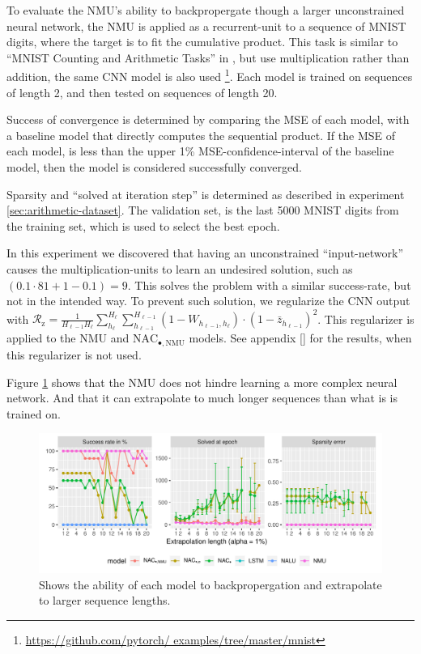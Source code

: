 To evaluate the NMU's ability to backpropergate though a larger unconstrained neural network, the NMU is applied as a recurrent-unit to a sequence of MNIST digits, where the target is to fit the cumulative product. This task is similar to ``MNIST Counting and Arithmetic Tasks'' in \cite{trask-nalu}, but use multiplication rather than addition, the same CNN model is also used \footnote{\url{https://github.com/pytorch/
examples/tree/master/mnist}}. Each model is trained on sequences of length 2, and then tested on sequences of length 20.

Success of convergence is determined by comparing the MSE of each model, with a baseline model that directly computes the sequential product. If the MSE of each model, is less than the upper 1\% MSE-confidence-interval of the baseline model, then the model is considered successfully converged.

Sparsity and ``solved at iteration step'' is determined as described in experiment \ref{sec:arithmetic-dataset}. The validation set, is the last 5000 MNIST digits from the training set, which is used to select the best epoch.

In this experiment we discovered that having an unconstrained ``input-network'' causes the multiplication-units to learn an undesired solution, such as $(0.1 \cdot 81 + 1 - 0.1) = 9$. This solves the problem with a similar success-rate, but not in the intended way. To prevent such solution, we regularize the CNN output with $\mathcal{R}_{\mathrm{z}} = \frac{1}{H_{\ell-1} H_\ell} \sum_{h_\ell}^{H_\ell} \sum_{h_{\ell-1}}^{H_{\ell-1}} (1 - W_{h_{\ell-1},h_\ell}) \cdot (1 - \bar{z}_{h_{\ell-1}})^2$. This regularizer is applied to the NMU and $\mathrm{NAC}_{\bullet,\mathrm{NMU}}$ models. See appendix \ref{} for the results, when this regularizer is not used.

Figure \ref{fig:sequential-mnist-prod-results} shows that the NMU does not hindre learning a more complex neural network. And that it can extrapolate to much longer sequences than what is is trained on.

\begin{figure}[h]
\centering
\includegraphics[width=\linewidth,trim={0 0.5cm 0 0},clip]{results/sequential_mnist_prod_long.pdf}
\caption{Shows the ability of each model to backpropergation and extrapolate to larger sequence lengths.} 
\label{fig:sequential-mnist-prod-results}
\end{figure}
